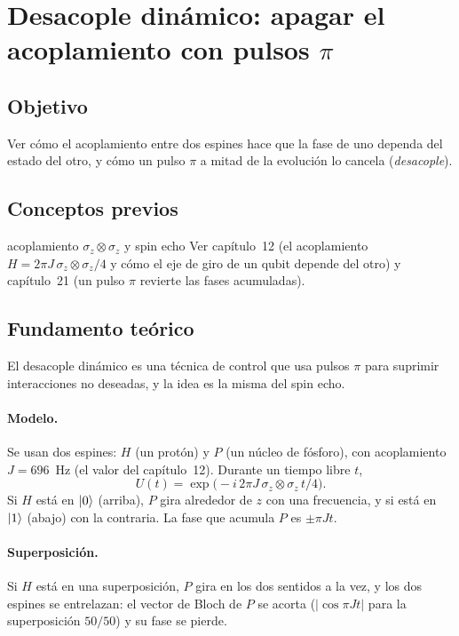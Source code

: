 \def\tituloconcepto{Desacople dinámico}


\section{Desacople dinámico: apagar el acoplamiento con pulsos $\pi$}

\subsection{Objetivo}
Ver cómo el acoplamiento entre dos espines hace que la fase de uno dependa del
estado del otro, y cómo un pulso $\pi$ a mitad de la evolución lo cancela
(\emph{desacople}).

\subsection{Conceptos previos}
\begin{concepto}{acoplamiento $\sigma_z\otimes\sigma_z$ y spin echo}
Ver capítulo~12 (el acoplamiento $H=2\pi J\,\sigma_z\otimes\sigma_z/4$ y cómo el
eje de giro de un qubit depende del otro) y capítulo~21 (un pulso $\pi$ revierte
las fases acumuladas).
\end{concepto}

\subsection{Fundamento teórico}
El desacople dinámico es una técnica de control que usa pulsos $\pi$ para
suprimir interacciones no deseadas, y la idea es la misma del spin echo.

\paragraph{Modelo.} Se usan dos espines: $H$ (un protón) y $P$ (un núcleo de
fósforo), con acoplamiento $J=696$~Hz (el valor del capítulo~12). Durante un
tiempo libre $t$,
\begin{equation}
  U(t)=\exp\!\big(-i\,2\pi J\,\sigma_z\otimes\sigma_z\,t/4\big).
\end{equation}
Si $H$ está en $\left|0\right\rangle$ (arriba), $P$ gira alrededor de $z$ con una frecuencia, y si
está en $\left|1\right\rangle$ (abajo) con la contraria. La fase que acumula $P$ es
$\pm\pi Jt$.

\paragraph{Superposición.} Si $H$ está en una superposición, $P$ gira en los
dos sentidos a la vez, y los dos espines se entrelazan: el vector de Bloch de
$P$ se acorta ($|\cos\pi Jt|$ para la superposición $50/50$) y su fase se
pierde.

